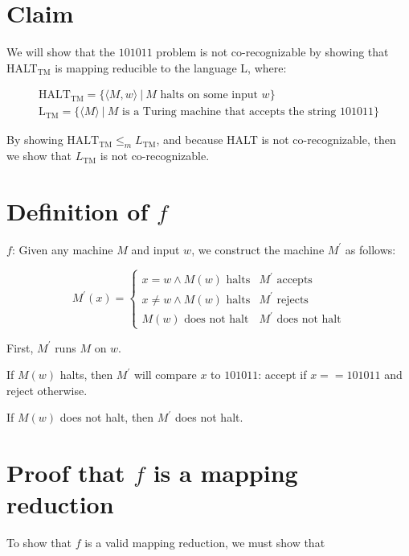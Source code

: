 \documentclass[11pt,addpoints,answers]{exam}
\newcommand{\1}{\mathbf{1}}
\begin{document}
\pagestyle{head}                %

\medskip
 
\section{Claim}

We will show that the $101011$ problem is not co-recognizable by showing that HALT$_{\text{TM}}$ is mapping reducible to the language L, where:

\begin{align*}
    \text{HALT}_{\text{TM}} = \{ \langle M, w \rangle \ | \ M \text{ halts on some input } w \} \\
    \text{L}_{\text{TM}} = \{ \langle M \rangle \ | \ M \text{ is a Turing machine that accepts the string } 101011 \}
\end{align*}

\noindent By showing $\text{HALT}_\text{TM} \leq_m L_\text{TM}$, and because HALT is not co-recognizable, then we show that $L_\text{TM}$ is not co-recognizable.

\section{Definition of $f$}

$f$: Given any machine $M$ and input $w$, we construct the machine $M^\prime$ as follows:

\[
M^\prime (x) =
\left\{
\begin{array}{ll}
    x = w \wedge M(w) \text{ halts} & M^\prime \text{ accepts} \\
    x \neq w \wedge M(w) \text{ halts} & M^\prime \text{ rejects} \\
    M(w) \text{ does not halt} & M^\prime \text{ does not halt}
\end{array}
\right.
\]

\noindent First, $M^\prime$ runs $M$ on $w$.

\noindent If $M(w)$ halts, then $M^\prime$ will compare $x$ to $101011$: accept if $x == 101011$ and reject otherwise.

\noindent If $M(w)$ does not halt, then $M^\prime$ does not halt.

\section{Proof that $f$ is a mapping reduction}

To show that $f$ is a valid mapping reduction, we must show that
\end{document}
